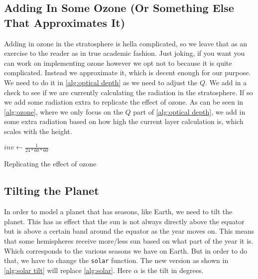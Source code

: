 \subsection{Adding In Some Ozone (Or Something Else That Approximates It)}
Adding in ozone in the stratosphere is hella complicated, so we leave that as an exercise to the reader as in true academic fashion. Just joking, if you want you can work on implementing ozone 
however we opt not to because it is quite complicated. Instead we approximate it, which is decent enough for our purpose. We need to do it in \autoref{alg:optical depth} as we need to adjust the
$Q$. We add in a check to see if we are currently calculating the radiation in the stratosphere. If so we add some radiation extra to replicate the effect of ozone. As can be seen in 
\autoref{alg:ozone}, where we only focus on the $Q$ part of \autoref{alg:optical depth}, we add in some extra radiation based on how high the current layer calculation is, which scales with the
height. 

\begin{algorithm}
    $inv \leftarrow \frac{1}{24*60*60}$ \;
    \caption{Replicating the effect of ozone}
    \label{alg:ozone}
\end{algorithm}

\subsection{Tilting the Planet}
In order to model a planet that has seasons, like Earth, we need to tilt the planet. This has as effect that the sun is not always directly above the equator but is above a certain band around
the equator as the year moves on. This means that some hemispheres receive more/less sun based on what part of the year it is. Which corresponds to the various seasons we have on Earth. But in
order to do that, we have to change the \texttt{solar} function. The new version as shown in \autoref{alg:solar tilt} will replace \autoref{alg:solar}. Here $\alpha$ is the tilt in degrees.


